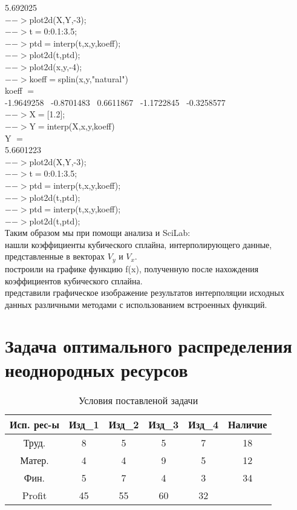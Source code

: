 \documentclass[russian,utf8,nocolumnxxxi,nocolumnxxxii]{eskdtext}
\begin{document}
5.692025 \\
$-->$plot2d(X,Y,-3);\\
$-->$t$=$0:0.1:3.5;\\
$-->$ptd$=$interp(t,x,y,koeff);\\
$-->$plot2d(t,ptd);\\
$-->$plot2d(x,y,-4);\\
$-->$koeff$=$splin(x,y,"natural")\\
koeff $=$\\
-1.9649258 \ -0.8701483 \ 0.6611867 \ -1.1722845 \ -0.3258577 \\
$-->$X$=$[1.2];\\
$-->$Y$=$interp(X,x,y,koeff)\\
Y $=$\\
5.6601223 \\
$-->$plot2d(X,Y,-3);\\
$-->$t$=$0:0.1:3.5;\\
$-->$ptd$=$interp(t,x,y,koeff);\\
$-->$plot2d(t,ptd);\\
$-->$ptd$=$interp(t,x,y,koeff);\\
$-->$plot2d(t,ptd);\\

Таким образом мы при помощи анализа и SciLab:
\\нашли коэффициенты кубического сплайна, интерполирующего данные, представленные в векторах $V_y$ и $V_x$.
\\построили на графике функцию f(x), полученную после нахождения коэффициентов кубического сплайна.
\\представили графическое изображение результатов интерполяции исходных данных различными методами с использованием встроенных функций.

\newpage
\section{Задача оптимального распределения неоднородных ресурсов}
\begin{table}[h]
\centering
\caption{Условия поставленой задачи}
\begin{tabular}[c]{|*{6}{c|}}
\hline
Исп. рес-ы & Изд\_1 & Изд\_2 & Изд\_3 & Изд\_4 & Наличие\\
\hline
Труд. & 8 & 5 & 5 & 7 & 18\\
\hline
Матер. & 4 & 4 & 9 & 5 & 12\\
\hline
Фин. & 5 & 7 & 4 & 3 & 34\\
\hline
Profit & 45 & 55 & 60 & 32 &  \\
\hline
\end{tabular}
\end{table}
\end{document}
